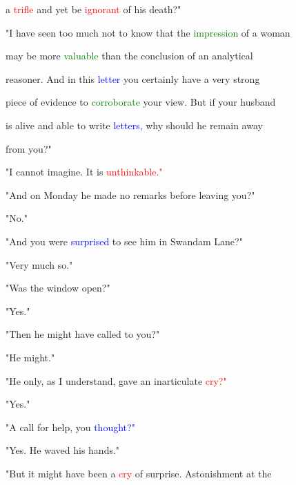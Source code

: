  a \textcolor{red}{trifle} and yet be \textcolor{red}{ignorant} of his \textcolor{BurntOrange}{death?"}



 "I have seen too much not to know that the \textcolor{green}{impression} of a woman

 may be more \textcolor{green}{valuable} than the conclusion of an analytical

 reasoner. And in this \textcolor{blue}{letter} you certainly have a very strong

 piece of evidence to \textcolor{green}{corroborate} your view. But if your husband

 is \textcolor{BurntOrange}{alive} and able to write \textcolor{blue}{letters,} why should he remain away

 from you?"



 "I cannot imagine. It is \textcolor{red}{unthinkable."}



 "And on Monday he made no remarks before \textcolor{BurntOrange}{leaving} you?"



 "No."



 "And you were \textcolor{blue}{surprised} to see him in Swandam Lane?"



 "Very much so."



 "Was the window open?"



 "Yes."



 "Then he might have called to you?"



 "He might."



 "He only, as I understand, gave an inarticulate \textcolor{red}{cry?"}



 "Yes."



 "A call for help, you \textcolor{blue}{thought?"}



 "Yes. He waved his hands."



 "But it might have been a \textcolor{red}{cry} of \textcolor{BurntOrange}{surprise.} \textcolor{BurntOrange}{Astonishment} at the

